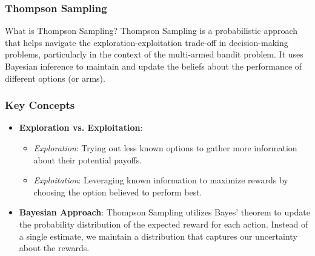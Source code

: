 \documentclass[aspectratio=169]{beamer}
\begin{document}
\begin{frame}[fragile]
    \frametitle{Thompson Sampling}
    \begin{block}{What is Thompson Sampling?}
        Thompson Sampling is a probabilistic approach that helps navigate the exploration-exploitation trade-off in decision-making problems, particularly in the context of the multi-armed bandit problem. It uses Bayesian inference to maintain and update the beliefs about the performance of different options (or arms).
    \end{block}
\end{frame}

\begin{frame}[fragile]
    \frametitle{Key Concepts}
    \begin{itemize}
        \item \textbf{Exploration vs. Exploitation}:
            \begin{itemize}
                \item \textit{Exploration}: Trying out less known options to gather more information about their potential payoffs.
                \item \textit{Exploitation}: Leveraging known information to maximize rewards by choosing the option believed to perform best.
            \end{itemize}
        \item \textbf{Bayesian Approach}:
            Thompson Sampling utilizes Bayes' theorem to update the probability distribution of the expected reward for each action. Instead of a single estimate, we maintain a distribution that captures our uncertainty about the rewards.
    \end{itemize}
\end{frame}
\end{document}
